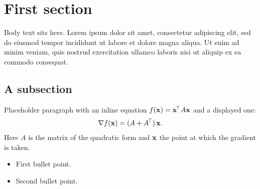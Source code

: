 

\begin{titlepage}
\thispagestyle{hstitlepage}
\vspace*{\fill}
\par\vspace{14pt}
\vspace{20pt}
\vspace*{\fill}\vspace*{\fill}
\end{titlepage}
\setcounter{page}{2}
\tableofcontents
\clearpage

\section{First section}

Body text sits here. Lorem ipsum dolor sit amet, consectetur adipiscing elit,
sed do eiusmod tempor incididunt ut labore et dolore magna aliqua. Ut enim ad
minim veniam, quis nostrud exercitation ullamco laboris nisi ut aliquip ex ea
commodo consequat.

\subsection{A subsection}
Placeholder paragraph with an inline equation $f(\mathbf{x}) = \mathbf{x}^{\!\top} A \mathbf{x}$ and a
displayed one:
\begin{equation}
\nabla f(\mathbf{x}) = (A + A^{\!\top})\,\mathbf{x}.
\end{equation}
Here $A$ is the matrix of the quadratic form and $\mathbf{x}$ the point at which the
gradient is taken.

\begin{itemize}
\item First bullet point.
\item Second bullet point.
\end{itemize}

\begin{hsstatrow}[3]
\end{hsstatrow}

